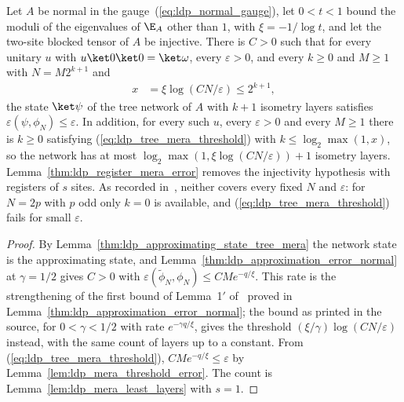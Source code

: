 \begin{lemma}
    \label{thm:ldp_tree_mera_error}
    \leanok
    Let $A$ be normal in the gauge~(\ref{eq:ldp_normal_gauge}), let $0<t<1$
    bound the moduli of the eigenvalues of $\E_A$ other than $1$, with
    $\xi=-1/\log t$, and let the two-site blocked tensor of $A$ be injective.
    There is $C>0$ such that for every unitary $u$ with
    $u\ket0\ket0=\ket\omega$, every $\varepsilon>0$, and every $k\ge0$ and
    $M\ge1$ with $N=M2^{k+1}$ and
    \begin{align}
        x & =\xi\log(CN/\varepsilon)\le2^{k+1},
        \label{eq:ldp_tree_mera_threshold}
    \end{align}
    the state $\ket\psi$ of the tree network of $A$ with $k+1$ isometry layers
    satisfies $\varepsilon(\psi,\phi_N)\le\varepsilon$. In addition, for every
    such $u$, every $\varepsilon>0$ and every $M\ge1$ there is $k\ge0$
    satisfying (\ref{eq:ldp_tree_mera_threshold}) with
    $k\le\log_2\max(1,x)$, so the network has at most
    $\log_2\max(1,\xi\log(CN/\varepsilon))+1$ isometry layers. Lemma~\ref{thm:ldp_register_mera_error} removes the
    injectivity hypothesis with registers of $s$ sites. As recorded
    in~\cite{gap:mswc24_tree_mera_scope}, neither covers every
    fixed $N$ and $\varepsilon$: for $N=2p$ with $p$ odd only $k=0$ is
    available, and (\ref{eq:ldp_tree_mera_threshold}) fails for small
    $\varepsilon$.
\end{lemma}
\begin{proof}
    \leanok
    By Lemma~\ref{thm:ldp_approximating_state_tree_mera} the network state
    is the approximating state, and Lemma~\ref{thm:ldp_approximation_error_normal}
    at $\gamma=1/2$ gives $C>0$ with
    $\varepsilon(\widetilde\phi_N,\phi_N)\le CMe^{-q/\xi}$. This rate is
    the strengthening of the first bound of Lemma~1$'$
    of~\cite{Malz2024Preparation} proved in
    Lemma~\ref{thm:ldp_approximation_error_normal}; the bound as printed
    in the source, for $0<\gamma<1/2$ with rate $e^{-\gamma q/\xi}$, gives the
    threshold $(\xi/\gamma)\log(CN/\varepsilon)$ instead, with the same
    count of layers up to a constant. From
    (\ref{eq:ldp_tree_mera_threshold}),
    $CMe^{-q/\xi}\le\varepsilon$ by Lemma~\ref{lem:ldp_mera_threshold_error}.
    The count is Lemma~\ref{lem:ldp_mera_least_layers} with $s=1$.
\end{proof}

